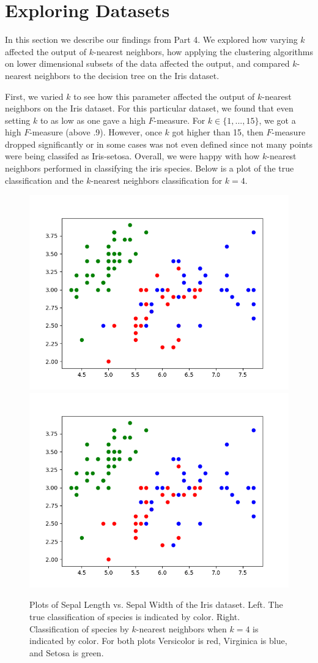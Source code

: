 \documentclass[psamsfonts,onesided,10pt]{amsart}
\begin{document}
\section{Exploring Datasets}
In this section we describe our findings from Part 4. We explored how varying $k$ affected the output of $k$-nearest neighbors, how applying the clustering algorithms on lower dimensional subsets of the data affected the output, and compared $k$-nearest neighbors to the decision tree on the Iris dataset. 

First, we varied $k$ to see how this parameter affected the output of $k$-nearest neighbors on the Iris dataset. For this particular dataset, we found that even setting $k$ to as low as one gave a high $F$-measure. For $k\in \{1,...,15\}$, we got a high $F$-measure (above .9). However, once $k$ got higher than 15, then $F$-measure dropped significantly or in some cases was not even defined since not many points were being classifed as Iris-setosa. Overall, we were happy with how $k$-nearest neighbors performed in classifying the iris species. Below is a plot of the true classification and the $k$-nearest neighbors classification for $k=4$. 

\begin{figure}[H]
    \centering
    {\includegraphics[width=.4\textwidth]{images/trueclass.png}} 
    {\includegraphics[width=.4\textwidth]{images/KNNclass.png}} 
    \caption{Plots of Sepal Length vs. Sepal Width of the Iris dataset. Left. The true classification of species is indicated by color. Right. Classification of species by $k$-nearest neighbors when $k=4$ is indicated by color. For both plots Versicolor is red, Virginica is blue, and Setosa is green.}
\end{figure}

\end{document}
